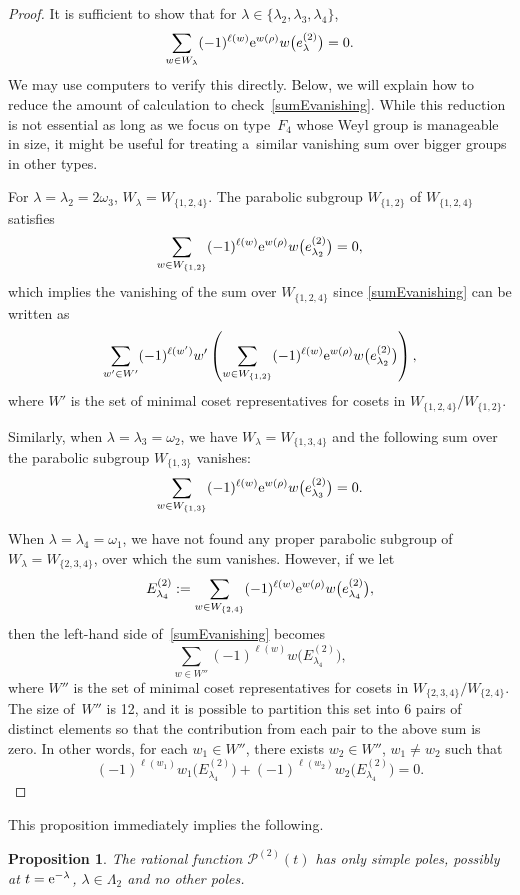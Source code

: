 \documentclass[pdftex]{sigma}
\numberwithin{equation}{section}
\newtheorem{Proposition}[Theorem]{Proposition}
\theoremstyle{definition}
\newcommand\La{\Lambda}
\newcommand\la{\lambda}
\begin{document}
\begin{proof}
It is sufficient to show that for $\la\in \{\la_2,\la_3,\la_4\}$,
\begin{equation}\label{sumEvanishing}
\sum_{w\in W_{\la}}(-1)^{\ell(w)}{\rm e}^{w(\rho)}w\bigl(e^{(2)}_{\la}\bigr)=0.
\end{equation}
We may use computers to verify this directly. Below, we will explain how to reduce the amount of calculation to check~\eqref{sumEvanishing}. While this reduction is not essential as long as we focus on type~$F_4$ whose Weyl group is manageable in size, it might be useful for treating a~similar vanishing sum over bigger groups in other types.

For $\la=\la_2=2\omega_3$, $W_{\la}=W_{\{1,2,4\}}$. The parabolic subgroup $W_{\{1,2\}}$ of $W_{\{1,2,4\}}$ satisfies
\[
\sum_{w\in W_{\{1,2\}}}(-1)^{\ell(w)}{\rm e}^{w(\rho)}w\bigl(e^{(2)}_{\la_2}\bigr)=0,
\]
which implies the vanishing of the sum over $W_{\{1,2,4\}}$ since
\eqref{sumEvanishing} can be written as
\[
\sum_{w'\in W'}(-1)^{\ell(w')}w'\left(\sum_{w\in W_{\{1,2\}}}(-1)^{\ell(w)}{\rm e}^{w(\rho)}w\bigl(e^{(2)}_{\la_2}\bigr)\right),
\]
where $W'$ is the set of minimal coset representatives for cosets in $W_{\{1,2,4\}}/W_{\{1,2\}}$.

Similarly, when $\la=\la_3=\omega_2$, we have $W_{\la}=W_{\{1,3,4\}}$ and the following sum over the parabolic subgroup $W_{\{1,3\}}$ vanishes:
\[
\sum_{w\in W_{\{1,3\}}}(-1)^{\ell(w)}{\rm e}^{w(\rho)}w\bigl(e^{(2)}_{\la_3}\bigr)=0.
\]

When $\la=\la_4=\omega_1$, we have not found any proper parabolic subgroup of $W_{\la}=W_{\{2,3,4\}}$, over which the sum vanishes. However, if we let
\[
E^{(2)}_{\la_4}:=\sum_{w\in W_{\{2,4\}}}(-1)^{\ell(w)}{\rm e}^{w(\rho)}w\bigl(e^{(2)}_{\la_4}\bigr),
\]
then the left-hand side of~\eqref{sumEvanishing} becomes
\[
\sum_{w\in W''}(-1)^{\ell(w)} w\bigl(E^{(2)}_{\la_4}\bigr),
\]
where $W''$ is the set of minimal coset representatives for cosets in $W_{\{2,3,4\}}/W_{\{2,4\}}$. The size of~$W''$ is 12, and it is possible to partition this set into 6 pairs of distinct elements so that the contribution from each pair to the above sum is zero. In other words, for each $w_1\in W''$, there exists $w_2\in W''$, $w_1\neq w_2$ such that
\[
(-1)^{\ell(w_1)} w_1\bigl(E^{(2)}_{\la_4}\bigr)+(-1)^{\ell(w_2)}w_2\bigl(E^{(2)}_{\la_4}\bigr)=0.\tag*{\qed}
\] \renewcommand{\qed}{}
\end{proof}

This proposition immediately implies the following.
\begin{Proposition}\label{prop:Ppoles}
The rational function $\mathcal{P}^{(2)}(t)$ has only simple poles, possibly at $t={\rm e}^{-\la}$, $\la\in \La_2$ and no other poles.
\end{Proposition}
\end{document}
